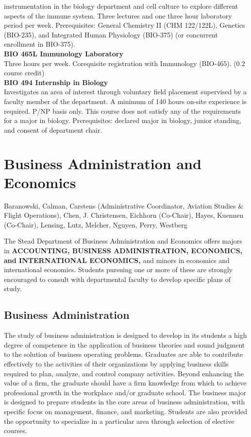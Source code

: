 \documentclass[
  letterpaper,
]{scrbook}
\begin{document}
instrumentation in the biology department and cell culture to explore
different aspects of the immune system. Three lectures and one three
hour laboratory period per week. Prerequisites: General Chemistry II
(CHM 122/122L), Genetics (BIO-235), and Integrated Human Physiology
(BIO-375) (or concurrent enrollment in BIO-375).\\
\textbf{BIO 465L Immunology Laboratory}\\
Three hours per week. Corequisite registration with Immunology
(BIO-465). (0.2 course credit)\\
\textbf{BIO 494 Internship in Biology}\\
Investigates an area of interest through voluntary field placement
supervised by a faculty member of the department. A minimum of 140 hours
on-site experience is required. P/NP basis only. This course does not
satisfy any of the requirements for a major in biology. Prerequisites:
declared major in biology, junior standing, and consent of department
chair.

\section{Business Administration and
Economics}\label{business-administration-and-economics}

Baranowski, Calman, Carstens (Administrative Coordinator, Aviation
Studies \& Flight Operations), Chen, J. Christensen, Eichhorn
(Co-Chair), Hayes, Kuennen (Co-Chair), Lensing, Lutz, Melcher, Nguyen,
Perry, Westberg

The Stead Department of Business Administration and Economics offers
majors in \textbf{ACCOUNTING, BUSINESS ADMINISTRATION, ECONOMICS, and
INTERNATIONAL ECONOMICS,} and minors in economics and international
economics. Students pursuing one or more of these are strongly
encouraged to consult with departmental faculty to develop specific
plans of study.

\subsection{Business Administration}\label{business-administration}

The study of business administration is designed to develop in its
students a high degree of competence in the application of business
theories and sound judgment to the solution of business operating
problems. Graduates are able to contribute effectively to the activities
of their organizations by applying business skills required to plan,
analyze, and control company activities. Beyond enhancing the value of a
firm, the graduate should have a firm knowledge from which to achieve
professional growth in the workplace and/or graduate school. The
business major is designed to prepare students in the core areas of
business administration, with specific focus on management, finance, and
marketing. Students are also provided the opportunity to specialize in a
particular area through selection of elective courses.
\end{document}
